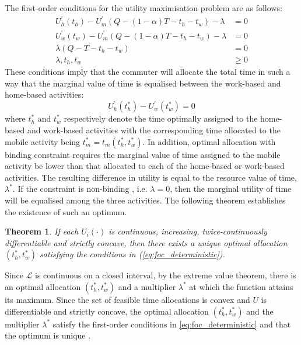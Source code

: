 \documentclass[12pt,a4paper,british]{article}
\makeatletter
\newenvironment{proof}[1][\proofname]{\par
    \normalfont\topsep6\p@\@plus6\p@\relax
    \trivlist
    \itemindent\parindent
    \item[\hskip\labelsep
          \scshape
      #1]\ignorespaces
  }{%
    \endtrivlist\@endpefalse
  }
\providecommand{\proofname}{Proof}
\newtheorem{theorem}{Theorem}[section]
\makeatother
\begin{document}

The first-order conditions for the utility maximisation problem are as follows:
\begin{subequations}
\begin{align}
U_{h}^{\prime}\left(t_{h}\right)-U_{m}^{\prime}\left(Q-\left(1-\alpha\right)T-t_{h}-t_{w}\right)-\lambda & =0
\label{eq:foc_deterministic_th} \\
U_{w}^{\prime}\left(t_{w}\right)-U_{m}^{\prime}\left(Q-\left(1-\alpha\right)T-t_{h}-t_{w}\right)-\lambda & =0
\label{eq:foc_deterministic_tw} \\
\lambda\left(Q-T-t_{h}-t_{w}\right) & =0
\label{eq:foc_deterministic_lmd} \\
\lambda,t_{h},t_{w} & \geq 0
\label{eq:foc_deterministic_nonnega}
\end{align}\label{eq:foc_deterministic}
\end{subequations}
These conditions imply that the commuter will allocate the total time in such a way that the marginal value of time is equalised between the work-based and home-based activities:%
\begin{equation}
U_{h}^{\prime}\left(t_{h}^{\ast}\right)-U_{w}^{\prime}\left(t_{w}^{\ast}\right)=0\label{eq:Uh_eq_Uw}
\end{equation}%
where $t_{h}^{\ast}$ and $t_{w}^{\ast}$ respectively denote the time optimally assigned to the home-based and work-based activities with the corresponding time allocated to the mobile activity being $t_{m}^{\ast}=t_{m}\left(t_{h}^{\ast},t_{w}^{\ast}\right)$. In addition, optimal allocation with binding constraint requires the marginal value of time assigned to the mobile activity be lower than that allocated to each of the home-based or work-based activities. The resulting difference in utility is equal to the resource value of time, $\lambda^{\ast}$. If the constraint is non-binding , i.e. $\lambda=0$, then the marginal utility of time will be equalised among the three activities. The following theorem establishes the existence of such an optimum.

\begin{theorem}
\label{thm:optimum_det}
If each $U_{i}\left(\cdot\right)$ is continuous, increasing, twice-continuously differentiable and strictly concave, then there exists a unique optimal allocation $\left( t_{h}^{\ast}, t_{w}^{\ast} \right)$ satisfying the conditions in (\ref{eq:foc_deterministic}).
\end{theorem}

\begin{proof} 
Since $\mathcal{L}$ is continuous on a closed interval, by the extreme value theorem, there is an optimal allocation $\left(t_{h}^{\ast},t_{w}^{\ast}\right)$ and a multiplier $\lambda^{\ast}$ at which the function attains its maximum. Since the set of feasible time allocations is convex and $U$ is differentiable and strictly concave, the optimal allocation  $\left(t_{h}^{\ast},t_{w}^{\ast}\right)$ and the multiplier $\lambda^{\ast} $ satisfy the first-order conditions in \eqref{eq:foc_deterministic} and that the optimum is unique \citep[Theorem 1.19 and Theorem 1.20 in][]{delaFuente2000MathematicalMethodsModels}.
\end{proof}
\end{document}

